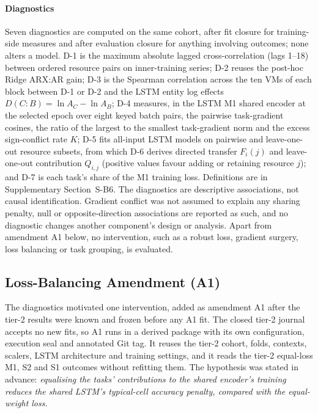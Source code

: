 \documentclass[5p,twocolumn]{elsarticle}
\begin{document}
\paragraph{Diagnostics} Seven diagnostics are computed on the same cohort,
after fit closure for training-side measures and after evaluation closure for
anything involving outcomes; none alters a model.
D-1 is the maximum absolute lagged cross-correlation (lags 1--18) between
ordered resource pairs on inner-training series; D-2 reuses the post-hoc Ridge
ARX:AR gain; D-3 is the Spearman correlation across the ten VMs of each block
between D-1 or D-2 and the LSTM entity log effects
$D(C\!:\!B)=\ln A_C-\ln A_B$; D-4 measures, in the LSTM M1 shared encoder at
the selected epoch over eight keyed batch pairs, the pairwise task-gradient
cosines, the ratio of the largest to the smallest task-gradient norm and the
excess sign-conflict rate $K$; D-5 fits all-input LSTM models on pairwise and
leave-one-out resource subsets, from which D-6 derives directed transfer
$F_i(j)$ and leave-one-out contribution $Q_{i,j}$ (positive values favour
adding or retaining resource $j$); and D-7 is each task's share of the M1
training loss. Definitions are in Supplementary Section~S-B6.
The diagnostics are descriptive associations, not causal identification.
Gradient conflict was not assumed to explain any sharing penalty, null or
opposite-direction associations are reported as such, and no diagnostic
changes another component's design or analysis. Apart from amendment A1
below, no intervention, such as a robust loss, gradient surgery, loss
balancing or task grouping, is evaluated.

\subsection{Loss-Balancing Amendment (A1)}
\label{sec:a1-design}

The diagnostics motivated one intervention, added as amendment A1 after the
tier-2 results were known and frozen before any A1 fit. The closed tier-2
journal accepts no new fits, so A1 runs in a derived package with its own
configuration, execution seal and annotated Git tag. It reuses the tier-2
cohort, folds, contexts, scalers, LSTM architecture and training settings,
and it reads the tier-2 equal-loss M1, S2 and S1 outcomes without refitting
them. The hypothesis was stated in advance: \emph{equalising the tasks'
contributions to the shared encoder's training reduces the shared LSTM's
typical-cell accuracy penalty, compared with the equal-weight loss.}
\end{document}
